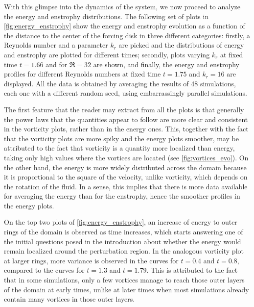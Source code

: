 \documentclass[../main.tex]{subfiles}
\begin{document}
\begin{figure}[!ht]
\end{figure}

With this glimpse into the dynamics of the system, we now proceed to analyze the energy and enstrophy distributions. The following set of plots in \cref{fig:energy_enstrophy} show the energy and enstrophy evolution as a function of the distance to the center of the forcing disk in three different categories: firstly, a Reynolds number and a parameter $k_r$ are picked and the distributions of energy and enstrophy are plotted for different times; secondly, plots varying $k_r$ at fixed time $t=1.66$ and for $\Re=32$ are shown, and finally, the energy and enstrophy profiles for different Reynolds numbers at fixed time $t=1.75$ and $k_r=16$ are displayed. All the data is obtained by averaging the results of 48 simulations, each one with a different random seed, using embarrassingly parallel simulations.

The first feature that the reader may extract from all the plots is that generally the power laws that the quantities appear to follow are more clear and consistent in the vorticity plots, rather than in the energy ones. This, together with the fact that the vorticity plots are more spiky and the energy plots smoother, may be attributed to the fact that vorticity is a quantity more localized than energy, taking only high values where the vortices are located (see \cref{fig:vortices_evo}). On the other hand, the energy is more widely distributed across the domain because it is proportional to the square of the velocity, unlike vorticity, which depends on the rotation of the fluid. In a sense, this implies that there is more data available for averaging the energy than for the enstrophy, hence the smoother profiles in the energy plots.

On the top two plots of \cref{fig:energy_enstrophy}, an increase of energy to outer rings of the domain is observed as time increases, which starts answering one of the initial questions posed in the introduction about whether the energy would remain localized around the perturbation region. In the analogous vorticity plot at larger rings, more variance is observed in the curves for $t=0.4$ and $t=0.8$, compared to the curves for $t=1.3$ and $t=1.79$. This is attributed to the fact that in some simulations, only a few vortices manage to reach those outer layers of the domain at early times, unlike at later times when most simulations already contain many vortices in those outer layers.
\end{document}
